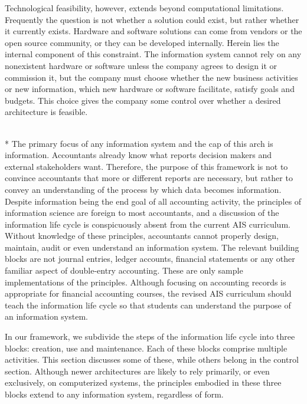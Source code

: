 \documentclass[12pt]{article}
\newcommand{\SubSection}[1]{\vspace{.15in}{\centering{}\normalsize{}\textbf{#1}}\\*\indent{}}
\begin{document}
Technological feasibility, however, extends beyond computational limitations. Frequently the question is not whether a solution could exist, but rather whether it currently exists. Hardware and software solutions can come from vendors or the open source community, or they can be developed internally. Herein lies the internal component of this constraint. The information system cannot rely on any nonexistent hardware or software unless the company agrees to design it or commission it, but the company must choose whether the new business activities or new information, which new hardware or software facilitate, satisfy goals and budgets. This choice gives the company some control over whether a desired architecture is feasible.

\SubSection{Information}
The primary focus of any information system and the cap of this arch is information. Accountants already know what reports decision makers and external stakeholders want. Therefore, the purpose of this framework is not to convince accountants that more or different reports are necessary, but rather to convey an understanding of the process by which data becomes information. Despite information being the end goal of all accounting activity, the principles of information science are foreign to most accountants, and a discussion of the information life cycle is conspicuously absent from the current AIS curriculum. Without knowledge of these principles, accountants cannot properly design, maintain, audit or even understand an information system. The relevant building blocks are not journal entries, ledger accounts, financial statements or any other familiar aspect of double-entry accounting. These are only sample implementations of the principles. Although focusing on accounting records is appropriate for financial accounting courses, the revised AIS curriculum should teach the information life cycle so that students can understand the purpose of an information system.

In our framework, we subdivide the steps of the information life cycle into three blocks: creation, use and maintenance. Each of these blocks comprise multiple activities. This section discusses some of these, while others belong in the control section. Although newer architectures are likely to rely primarily, or even exclusively, on computerized systems, the principles embodied in these three blocks extend to any information system, regardless of form.
\end{document}

